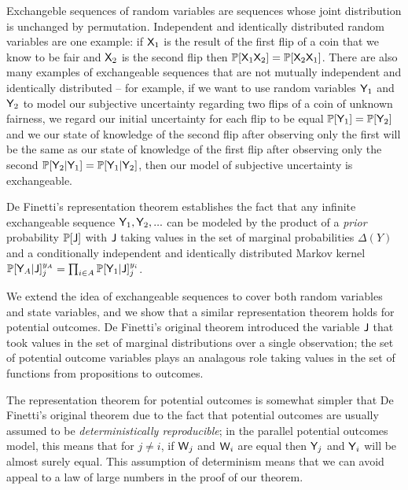 Exchangeble sequences of random variables are sequences whose joint distribution is unchanged by permutation. Independent and identically distributed random variables are one example: if $\mathsf{X}_1$ is the result of the first flip of a coin that we know to be fair and $\mathsf{X}_2$ is the second flip then $\mathbb{P}[\mathsf{X}_1\mathsf{X}_2]=\mathbb{P}[\mathsf{X}_2\mathsf{X}_1]$. There are also many examples of exchangeable sequences that are not mutually independent and identically distributed -- for example, if we want to use random variables $\mathsf{Y}_1$ and $\mathsf{Y}_2$ to model our subjective uncertainty regarding two flips of a coin of unknown fairness, we regard our initial uncertainty for each flip to be equal $\mathbb{P}[\mathsf{Y}_1]=\mathbb{P}[\mathsf{Y}_2]$ and we our state of knowledge of the second flip after observing only the first will be the same as our state of knowledge of the first flip after observing only the second $\mathbb{P}[\mathsf{Y}_2|\mathsf{Y}_1]=\mathbb{P}[\mathsf{Y}_1|\mathsf{Y}_2]$, then our model of subjective uncertainty is exchangeable.

De Finetti's representation theorem establishes the fact that any infinite exchangeable sequence $\mathsf{Y}_1, \mathsf{Y}_2, ...$ can be modeled by the product of a \emph{prior} probability $\mathbb{P}[\mathsf{J}]$ with $\mathsf{J}$ taking values in the set of marginal probabilities $\Delta(Y)$ and a conditionally independent and identically distributed Markov kernel $\mathbb{P}[\mathsf{Y}_A|\mathsf{J}]_j^{y_A} = \prod_{i\in A} \mathbb{P}[\mathsf{Y}_1|\mathsf{J}]_j^{y_i}$.

We extend the idea of exchangeable sequences to cover both random variables and state variables, and we show that a similar representation theorem holds for potential outcomes. De Finetti's original theorem introduced the variable $\mathsf{J}$ that took values in the set of marginal distributions over a single observation; the set of potential outcome variables plays an analagous role taking values in the set of functions from propositions to outcomes.

The representation theorem for potential outcomes is somewhat simpler that De Finetti's original theorem due to the fact that potential outcomes are usually assumed to be \emph{deterministically reproducible}; in the parallel potential outcomes model, this means that for $j\neq i$, if $\mathsf{W}_j$ and $\mathsf{W}_i$ are equal then $\mathsf{Y}_j$ and $\mathsf{Y}_i$ will be almost surely equal. This assumption of determinism means that we can avoid appeal to a law of large numbers in the proof of our theorem.


